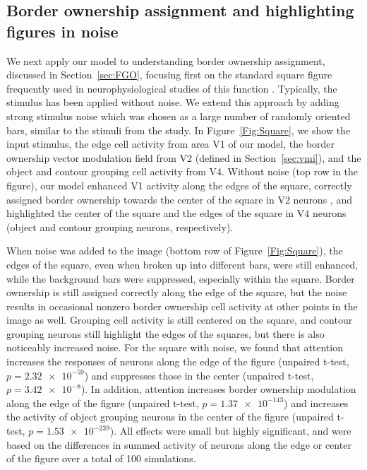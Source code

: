 \subsection{Border ownership assignment and highlighting figures in noise}
\label{sec:BOS}
We next apply our model to understanding border ownership assignment,
discussed in Section~\ref{sec:FGO}, focusing first on the standard square
figure frequently used in neurophysiological studies of this function
\citep{Zhou_etal00,Qiu_etal07,Sugihara_etal11,Williford_vonderHeydt13,Williford_vonderHeydt14,Martin_vonderHeydt15}. Typically, the stimulus has been applied without noise. We extend
this approach by adding strong stimulus noise which was chosen as a
large number of randomly oriented bars, similar to the stimuli from
the \cite{Chen_etal14} study. In Figure~\ref{Fig:Square}, we show the
input stimulus, the edge cell activity from area V1 of our model, the
border ownership vector modulation field from V2 (defined in
Section~\ref{sec:vmi}), 
and the object and contour grouping cell
activity from V4.  Without noise (top row in the figure), our model
enhanced V1 activity along the edges of the square, correctly assigned
border ownership towards the center of the square in V2 neurons
\citep[in agreement with][] {Zhou_etal00}, and highlighted the center
of the square and the edges of the square in V4 neurons (object and
contour grouping neurons, respectively).

When noise was added to the image (bottom row of
Figure~\ref{Fig:Square}), the edges of the square, even when broken up
into different bars, were still enhanced, while the background bars
were suppressed, especially within the square.
Border ownership is still assigned correctly
along the edge of the square, but the noise results in occasional 
nonzero border ownership cell activity at other points in the image as
well. Grouping cell activity is still centered on the square, and
contour grouping neurons still highlight the edges of the squares, but
there is also noticeably increased noise.
For the square with noise, we found that attention increases the
responses of neurons along the edge of the figure (unpaired t-test,
$p=\num{2.32e-59}$) and suppresses those in the center (unpaired
t-test, $p=\num{3.42e-8}$). In addition, attention increases border
ownership modulation along the edge of the figure (unpaired t-test,
$p=\num{1.37e-143}$) and increases the activity of object grouping
neurons in the center of the figure (unpaired t-test,
$p=\num{1.53e-239}$). All effects were small but highly significant,
and were based on the differences in summed activity of neurons along
the edge or center of the figure over a total of 100 simulations.

